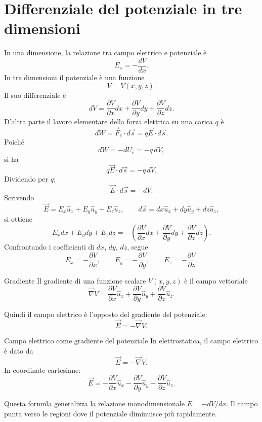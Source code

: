 \documentclass[a4paper]{article}
\begin{document}
\section{Differenziale del potenziale in tre dimensioni}

In una dimensione, la relazione tra campo elettrico e potenziale è
\[
    E_x=-\frac{dV}{dx}.
\]
In tre dimensioni il potenziale è una funzione
\[
    V=V(x,y,z).
\]
Il suo differenziale è
\[
    dV=\frac{\partial V}{\partial x}dx+\frac{\partial V}{\partial y}dy+\frac{\partial V}{\partial z}dz.
\]
D'altra parte il lavoro elementare della forza elettrica su una carica \(q\) è
\[
    dW=\vec{F}_e\cdot d\vec{s}=q\vec{E}\cdot d\vec{s}.
\]
Poiché
\[
    dW=-dU_e=-q\,dV,
\]
si ha
\[
    q\vec{E}\cdot d\vec{s}=-q\,dV.
\]
Dividendo per \(q\):
\[
    \vec{E}\cdot d\vec{s}=-dV.
\]
Scrivendo
\[
    \vec{E}=E_x\hat{u}_x+E_y\hat{u}_y+E_z\hat{u}_z,
    \qquad
    d\vec{s}=dx\hat{u}_x+dy\hat{u}_y+dz\hat{u}_z,
\]
si ottiene
\[
    E_xdx+E_ydy+E_zdz
    =-\left(\frac{\partial V}{\partial x}dx+\frac{\partial V}{\partial y}dy+\frac{\partial V}{\partial z}dz\right).
\]
Confrontando i coefficienti di \(dx\), \(dy\), \(dz\), segue
\[
    E_x=-\frac{\partial V}{\partial x},
    \qquad
    E_y=-\frac{\partial V}{\partial y},
    \qquad
    E_z=-\frac{\partial V}{\partial z}.
\]

\begin{snippetdefinition}{Gradiente}
    Il gradiente di una funzione scalare \(V(x,y,z)\) è il campo vettoriale
    \[
        \vec{\nabla}V=\frac{\partial V}{\partial x}\hat{u}_x+\frac{\partial V}{\partial y}\hat{u}_y+\frac{\partial V}{\partial z}\hat{u}_z.
    \]
\end{snippetdefinition}

Quindi il campo elettrico è l'opposto del gradiente del potenziale:
\[
    \vec{E}=-\vec{\nabla}V.
\]

\begin{snippettheorem}{Campo elettrico come gradiente del potenziale}
    In elettrostatica, il campo elettrico è dato da
    \[
        \vec{E}=-\vec{\nabla}V.
    \]
    In coordinate cartesiane:
    \[
        \vec{E}
        =-\frac{\partial V}{\partial x}\hat{u}_x
        -\frac{\partial V}{\partial y}\hat{u}_y
        -\frac{\partial V}{\partial z}\hat{u}_z.
    \]
\end{snippettheorem}

Questa formula generalizza la relazione monodimensionale \(E=-dV/dx\). Il campo punta verso le regioni dove il potenziale diminuisce più rapidamente.
\end{document}
